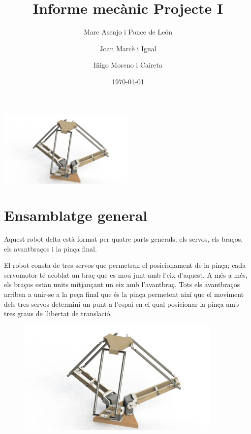 \documentclass[a4paper, 10pt]{article}
\begin{document}
\title{Informe mecànic Projecte I}
\author{Marc Asenjo i Ponce de León \and
		Joan Marcè i Igual \and
		Iñigo Moreno i Caireta}
\date{\today}
\maketitle
\begin{center}
\includegraphics[width=0.5\textwidth]{./images/logo}
\end{center}

\newpage
\tableofcontents{}

\newpage
\section{Ensamblatge general}

Aquest robot delta està format per quatre parts generals; els servos, els braços, els avantbraços i la pinça final. 

El robot consta de tres servos que permetran el posicionament de la pinça; cada servomotor té acoblat un braç que es mou junt amb l'eix d'aquest. A més a més, els
braços estan units mitjançant un eix amb l'avantbraç. Tots els avantbraços arriben a unir-se a la peça final que és la pinça permetent així que el moviment dels tres servos determini un punt a l'espai en el qual posicionar la pinça amb tres graus de llibertat de translació.

\begin{figure}[h!]
\centering
\includegraphics[width=10cm]{./images/general}
\end{figure}
\end{document}
